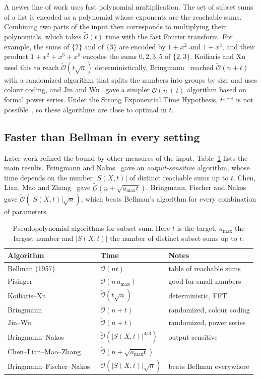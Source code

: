 \documentclass[11pt]{article}
\newcommand{\Oh}{\mathcal{O}}
\newcommand{\Ot}{\tilde{\mathcal{O}}}
\begin{document}
A newer line of work uses fast polynomial multiplication. The set of subset
sums of a list is encoded as a polynomial whose exponents are the reachable
sums. Combining two parts of the input then corresponds to multiplying their
polynomials, which takes $\Ot(t)$ time with the fast Fourier transform. For
example, the sums of $\{2\}$ and of $\{3\}$ are encoded by $1+x^2$ and $1+x^3$,
and their product $1+x^2+x^3+x^5$ encodes the sums $0,2,3,5$ of $\{2,3\}$.
Koiliaris and Xu~\cite{kx} used this to reach $\Ot(t\sqrt n)$ deterministically.
Bringmann~\cite{bri} reached $\Ot(n+t)$ with a randomized algorithm that splits
the numbers into groups by size and uses colour coding, and Jin and
Wu~\cite{jwsosa} gave a simpler $\Ot(n+t)$ algorithm based on formal power
series. Under the Strong Exponential Time Hypothesis, $t^{1-\epsilon}$ is not
possible~\cite{abhs}, so these algorithms are close to optimal in $t$.

\subsection{Faster than Bellman in every setting}
Later work refined the bound by other measures of the input.
Table~\ref{tab:pseudo} lists the main results. Bringmann and Nakos~\cite{bn}
gave an \emph{output-sensitive} algorithm, whose time depends on the number
$|S(X,t)|$ of distinct reachable sums up to $t$. Chen, Lian, Mao and
Zhang~\cite{clmz} gave $\Ot(n+\sqrt{a_{\max}t})$. Bringmann, Fischer and
Nakos~\cite{bfn} gave $\Ot(|S(X,t)|\sqrt n)$, which beats Bellman's algorithm
for every combination of parameters.

\begin{table}[t]
\centering
\caption{Pseudopolynomial algorithms for subset sum. Here $t$ is the target,
$a_{\max}$ the largest number and $|S(X,t)|$ the number of distinct subset sums
up to $t$.}
\label{tab:pseudo}
\small
\begin{tabular}{p{4.2cm}p{3.6cm}p{5.2cm}}
\toprule
Algorithm & Time & Notes \\
\midrule
Bellman (1957) & $\Oh(nt)$ & table of reachable sums \\
Pisinger~\cite{pis} & $\Oh(n\,a_{\max})$ & good for small numbers \\
Koiliaris--Xu~\cite{kx} & $\Ot(t\sqrt n)$ & deterministic, FFT \\
Bringmann~\cite{bri} & $\Ot(n+t)$ & randomized, colour coding \\
Jin--Wu~\cite{jwsosa} & $\Ot(n+t)$ & randomized, power series \\
Bringmann--Nakos~\cite{bn} & $\Ot(|S(X,t)|^{4/3})$ & output-sensitive \\
Chen--Lian--Mao--Zhang~\cite{clmz} & $\Ot(n+\sqrt{a_{\max}t})$ & \\
Bringmann--Fischer--Nakos~\cite{bfn} & $\Ot(|S(X,t)|\sqrt n)$ & beats Bellman everywhere \\
\bottomrule
\end{tabular}
\end{table}
\end{document}
